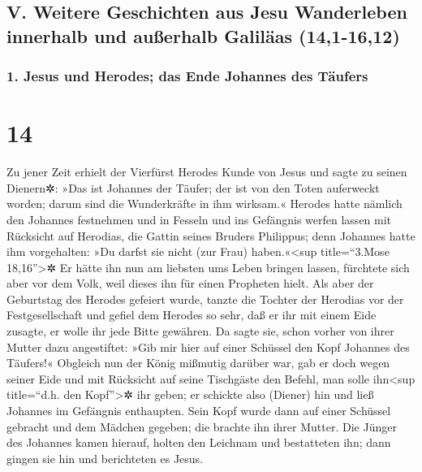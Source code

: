 \hypertarget{v.-weitere-geschichten-aus-jesu-wanderleben-innerhalb-und-auuxdferhalb-galiluxe4as-141-1612}{%
\subsection{V. Weitere Geschichten aus Jesu Wanderleben innerhalb und
außerhalb Galiläas
(14,1-16,12)}\label{v.-weitere-geschichten-aus-jesu-wanderleben-innerhalb-und-auuxdferhalb-galiluxe4as-141-1612}}

\hypertarget{jesus-und-herodes-das-ende-johannes-des-tuxe4ufers}{%
\subsubsection{1. Jesus und Herodes; das Ende Johannes des
Täufers}\label{jesus-und-herodes-das-ende-johannes-des-tuxe4ufers}}

\hypertarget{section-13}{%
\section{14}\label{section-13}}

 Zu jener Zeit erhielt der Vierfürst Herodes Kunde von
Jesus  und sagte zu seinen Dienern✲: »Das ist Johannes der
Täufer; der ist von den Toten auferweckt worden; darum sind die
Wunderkräfte in ihm wirksam.«  Herodes hatte nämlich den
Johannes festnehmen und in Fesseln und ins Gefängnis werfen lassen mit
Rücksicht auf Herodias, die Gattin seines Bruders Philippus;
 denn Johannes hatte ihm vorgehalten: »Du darfst sie nicht
(zur Frau) haben.«\textless sup title=``3.Mose 18,16''\textgreater✲
 Er hätte ihn nun am liebsten ums Leben bringen lassen,
fürchtete sich aber vor dem Volk, weil dieses ihn für einen Propheten
hielt.  Als aber der Geburtstag des Herodes gefeiert
wurde, tanzte die Tochter der Herodias vor der Festgesellschaft und
gefiel dem Herodes so sehr,  daß er ihr mit einem Eide
zusagte, er wolle ihr jede Bitte gewähren.  Da sagte sie,
schon vorher von ihrer Mutter dazu angestiftet: »Gib mir hier auf einer
Schüssel den Kopf Johannes des Täufers!«  Obgleich nun der
König mißmutig darüber war, gab er doch wegen seiner Eide und mit
Rücksicht auf seine Tischgäste den Befehl, man solle ihn\textless sup
title=``d.h. den Kopf''\textgreater✲ ihr geben;  er
schickte also (Diener) hin und ließ Johannes im Gefängnis enthaupten.
 Sein Kopf wurde dann auf einer Schüssel gebracht und dem
Mädchen gegeben; die brachte ihn ihrer Mutter.  Die
Jünger des Johannes kamen hierauf, holten den Leichnam und bestatteten
ihn; dann gingen sie hin und berichteten es Jesus.

